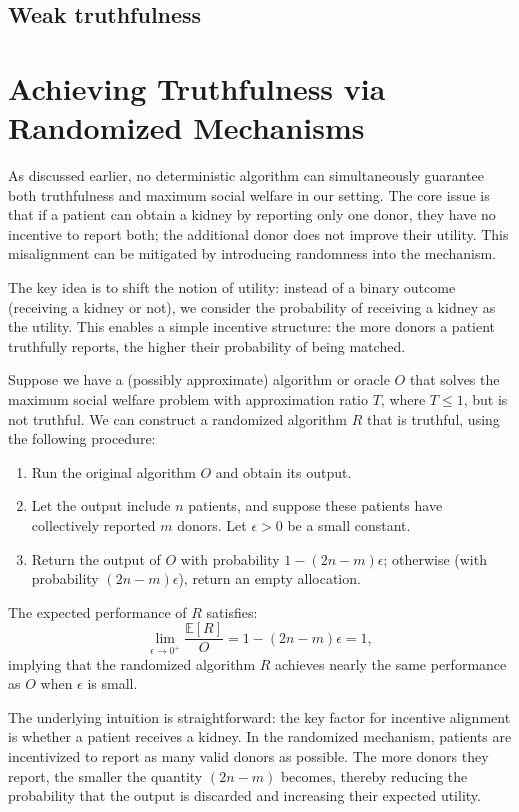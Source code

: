 \subsection{Weak truthfulness}




\section{Achieving Truthfulness via Randomized Mechanisms}

As discussed earlier, no deterministic algorithm can simultaneously guarantee both truthfulness and maximum social welfare in our setting. The core issue is that if a patient can obtain a kidney by reporting only one donor, they have no incentive to report both; the additional donor does not improve their utility. This misalignment can be mitigated by introducing randomness into the mechanism.

The key idea is to shift the notion of utility: instead of a binary outcome (receiving a kidney or not), we consider the probability of receiving a kidney as the utility. This enables a simple incentive structure: the more donors a patient truthfully reports, the higher their probability of being matched.

Suppose we have a (possibly approximate) algorithm or oracle $O$ that solves the maximum social welfare problem with approximation ratio $T$, where $T \leq 1$, but is not truthful. We can construct a randomized algorithm $R$ that is truthful, using the following procedure:

\begin{enumerate}
    \item Run the original algorithm $O$ and obtain its output.
    \item Let the output include $n$ patients, and suppose these patients have collectively reported $m$ donors. Let $\epsilon > 0$ be a small constant.
    \item Return the output of $O$ with probability $1 - (2n - m)\epsilon$; otherwise (with probability $(2n - m)\epsilon$), return an empty allocation.
\end{enumerate}

The expected performance of $R$ satisfies:
\[
\lim_{\epsilon \to 0^+} \frac{\mathbb{E}[R]}{O} = 1 - (2n - m)\epsilon = 1,
\]
implying that the randomized algorithm $R$ achieves nearly the same performance as $O$ when $\epsilon$ is small.

The underlying intuition is straightforward: the key factor for incentive alignment is whether a patient receives a kidney. In the randomized mechanism, patients are incentivized to report as many valid donors as possible. The more donors they report, the smaller the quantity $(2n - m)$ becomes, thereby reducing the probability that the output is discarded and increasing their expected utility.

